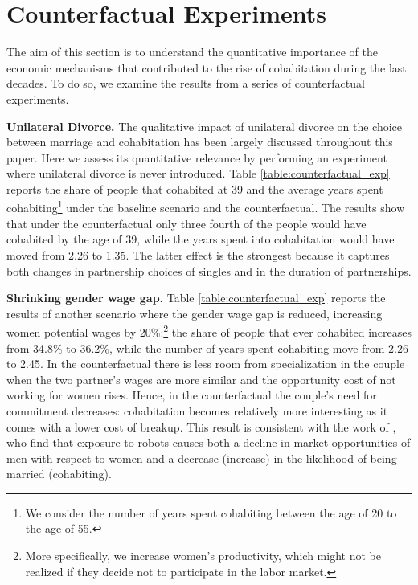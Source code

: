 \documentclass[12pt]{article}
\numberwithin{table}{section}
\begin{document}
\section{Counterfactual Experiments}
The aim of this section is to understand the quantitative importance of the economic mechanisms that contributed to the rise of cohabitation during the last decades. To do so, we examine the results from a series of counterfactual experiments.

\textbf{Unilateral Divorce.} The qualitative impact of unilateral divorce on the choice between marriage and cohabitation has been largely discussed throughout this paper. Here we assess its quantitative relevance by performing an experiment where unilateral divorce is never introduced. Table \ref{table:counterfactual_exp} reports the share of people that cohabited at 39 and the average years spent cohabiting\footnote{We consider the number of years spent cohabiting between the age of 20 to the age of 55.} under the baseline scenario and the counterfactual. The results show that under the counterfactual only three fourth of the people would have cohabited by the age of 39, while the years spent into cohabitation would have moved from 2.26 to 1.35. The latter effect is the strongest because it captures both changes in partnership choices of singles and in the duration of partnerships.

\textbf{Shrinking gender wage gap.} Table \ref{table:counterfactual_exp} reports the results of another scenario where the gender wage gap is reduced, increasing women potential wages by 20\%:\footnote{More specifically, we increase women's productivity, which might not be realized if they decide not to participate in the labor market.} the share of people that ever cohabited increases from 34.8\% to 36.2\%, while the number of years spent cohabiting move from 2.26 to 2.45. In the counterfactual there is less room from specialization in the couple when the two partner's wages are more similar and the opportunity cost of not working for women rises. Hence, in the counterfactual the couple's need for commitment decreases: cohabitation becomes relatively more interesting as it comes with a lower cost of breakup. This result is consistent with the work of \cite{anelli2019}, who find that exposure to robots causes both a decline in market opportunities of men with respect to women and a decrease (increase) in the likelihood of being married (cohabiting).
\end{document}
